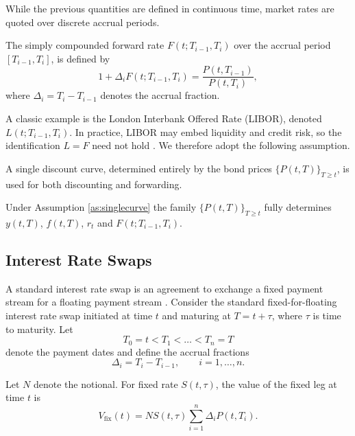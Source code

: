 While the previous quantities are defined in continuous time, market rates are quoted over discrete accrual periods.

\begin{definition}
The simply compounded forward rate $F(t;T_{i-1},T_i)$ over the accrual period $[T_{i-1},T_i]$, is defined by
\begin{equation}
1+\Delta_i F(t;T_{i-1},T_i)=\frac{P(t,T_{i-1})}{P(t,T_i)},
\label{eq:discrete_forward}
\end{equation}
where $\Delta_i=T_i-T_{i-1}$ denotes the accrual fraction.
\end{definition}

A classic example is the London Interbank Offered Rate (LIBOR), denoted $L(t;T_{i-1},T_i)$. In practice, LIBOR may embed liquidity and credit risk, so the identification $L=F$ need not hold \citep[p. 7]{Filipovic2009}. We therefore adopt the following assumption.


\begin{assumption}
A single discount curve, determined entirely by the bond prices $\{P(t,T)\}_{T\geq t}$, is used for both discounting and forwarding. 
\label{as:singlecurve}
\end{assumption}

Under Assumption \ref{as:singlecurve} the family $\{P(t,T)\}_{T\geq t}$ fully determines $y(t,T)$, $f(t,T)$, $r_t$ and $F(t;T_{i-1},T_i)$. 


\subsection{Interest Rate Swaps}
\label{subsec:interest_rate_swaps}

A standard interest rate swap is an agreement to exchange a fixed payment stream for a floating payment stream \citep{Filipovic2009}. Consider the standard fixed-for-floating interest rate swap initiated at time $t$ and maturing at $T=t+\tau$, where $\tau$ is time to maturity. Let
\[
T_0=t<T_1<\dots<T_n=T
\]
denote the payment dates and define the accrual fractions
\[
\Delta_i = T_i-T_{i-1}, \qquad i=1,\dots,n.
\]

Let $N$ denote the notional. For fixed rate $S(t,\tau)$, the value of the fixed leg at time $t$ is
\begin{equation}
V_{\mathrm{fix}}(t)
=
N S(t,\tau)
\sum_{i=1}^{n}\Delta_i P(t,T_i).
\label{eq:fixed_leg}
\end{equation}

